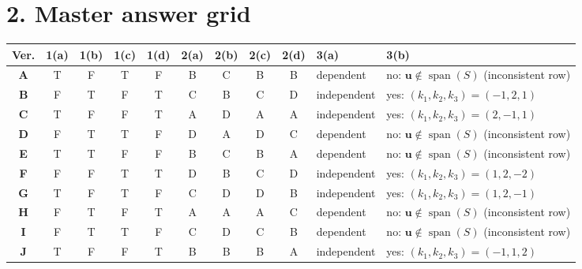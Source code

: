 \documentclass[11pt,a4paper]{article}
\begin{document}
\section*{2. Master answer grid}
{\small\begin{tabularx}{\linewidth}{@{}c cccc cccc l X@{}}\toprule
Ver. & 1(a) & 1(b) & 1(c) & 1(d) & 2(a) & 2(b) & 2(c) & 2(d) & 3(a) & 3(b) \\\midrule
\textbf{A} & T & F & T & F & B & C & B & B & dependent & no: $\mathbf{u}\notin\operatorname{span}(S)$ (inconsistent row) \\
\textbf{B} & F & T & F & T & C & B & C & D & independent & yes: $(k_1,k_2,k_3)=(-1,2,1)$ \\
\textbf{C} & T & F & F & T & A & D & A & A & independent & yes: $(k_1,k_2,k_3)=(2,-1,1)$ \\
\textbf{D} & F & T & T & F & D & A & D & C & dependent & no: $\mathbf{u}\notin\operatorname{span}(S)$ (inconsistent row) \\
\textbf{E} & T & T & F & F & B & C & B & A & dependent & no: $\mathbf{u}\notin\operatorname{span}(S)$ (inconsistent row) \\
\textbf{F} & F & F & T & T & D & B & C & D & independent & yes: $(k_1,k_2,k_3)=(1,2,-2)$ \\
\textbf{G} & T & F & T & F & C & D & D & B & independent & yes: $(k_1,k_2,k_3)=(1,2,-1)$ \\
\textbf{H} & F & T & F & T & A & A & A & C & dependent & no: $\mathbf{u}\notin\operatorname{span}(S)$ (inconsistent row) \\
\textbf{I} & F & T & T & F & C & D & C & B & dependent & no: $\mathbf{u}\notin\operatorname{span}(S)$ (inconsistent row) \\
\textbf{J} & T & F & F & T & B & B & B & A & independent & yes: $(k_1,k_2,k_3)=(-1,1,2)$ \\
\bottomrule\end{tabularx}}
\end{document}
